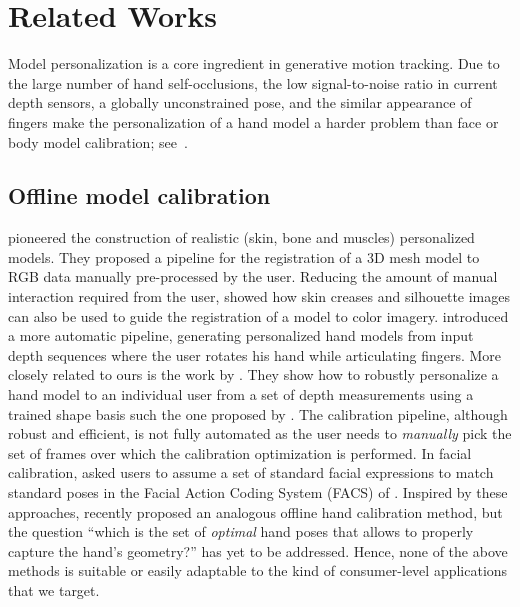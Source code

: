 \section{Related Works} \label{sec:honline-related}

Model personalization is a core ingredient in generative motion tracking.  Due to the large number of hand self-occlusions, the low signal-to-noise ratio in current depth sensors, a globally unconstrained pose, and the similar appearance of fingers make the personalization of a hand model a harder problem than face or body model calibration; see~\cite{supancic2015depth}.

\subsection*{Offline model calibration}
\cite{albrecht2003construction} pioneered the construction of realistic (skin, bone and muscles) personalized models. They proposed a pipeline for the registration of a 3D mesh model to RGB data manually pre-processed by the user. Reducing the amount of manual interaction required from the user, \cite{rhee2006human} showed how skin creases and silhouette images can also be used to guide the registration of a model to color imagery. \cite{taylor2014user} introduced a more automatic pipeline, generating personalized hand models from input depth sequences where the user rotates his hand while articulating fingers. More closely related to ours is the work by \cite{tan2016fits}. They show how to robustly personalize a hand model to an individual user from a set of depth measurements using a trained shape basis such the one proposed by \cite{khamis15learning}. The calibration pipeline, although robust and efficient, is not fully automated as the user needs to \emph{manually} pick the set of frames over which the calibration optimization is performed. 
In facial calibration, \cite{weise2011realtime} asked users to assume a set of standard facial expressions to match standard poses in the Facial Action Coding System (FACS) of \cite{facs}.
Inspired by these approaches, \cite{taylor2016joint} recently proposed an analogous offline hand calibration method, but the question ``which is the set of \emph{optimal} hand poses that allows to properly capture the hand's geometry?'' has yet to be addressed. Hence, none of the above methods is suitable or easily adaptable to the kind of consumer-level applications that we target.

